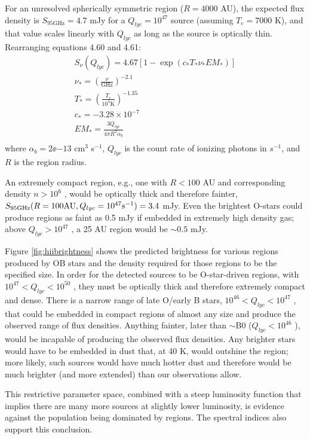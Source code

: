 \documentclass[twocolumn]{aastex61}
\begin{document}
For an unresolved spherically symmetric \hii region ($R=4000$ AU), the expected
flux density is $S_{95 \mathrm{GHz}} = 4.7$ mJy for a $Q_{lyc}=10^{47}$ \pers
source (assuming $T_e=7000$ K), and that value scales linearly with $Q_{lyc}$
as long as the source is optically thin.  Rearranging \citet{Condon2007a} equations
4.60 and 4.61:
\begin{eqnarray}
S_{\nu}(Q_{lyc})  = 4.67 \left[1-\exp\left(c_* T_* \nu_* EM_* \right) \right] \nonumber \\
\nu_* = \left(\frac{\nu}{\mathrm{GHz}}\right)^{-2.1} \nonumber \\
T_* = \left(\frac{T_e}{10^4 \mathrm{K}}\right)^{-1.35} \nonumber \\
c_* = -3.28\times10^{-7} \nonumber \\
EM_* = \frac{3 Q_{lyc}}{4 \pi R^2 \alpha_b} \nonumber \\
\end{eqnarray}
where $\alpha_b=2\ee{-13}$ cm$^3$ s$^{-1}$, $Q_{lyc}$ is the count rate
of ionizing photons in $s^{-1}$, and $R$ is the \hii region radius.

An extremely compact \hii region,
e.g., one with $R<100$ AU and corresponding density $n>10^6$ \percc, would be
optically thick and therefore fainter, $S_{95 \mathrm{GHz}}(R=100 \mathrm{AU},
Q_{lyc}=10^{47} \mathrm{s}^{-1})=3.4$ mJy.  Even the brightest O-stars could produce \hii
regions as faint as 0.5 mJy if embedded in extremely high density gas; above
$Q_{lyc}>10^{47}$ \pers, a 25 AU \hii region would be $\sim0.5$ mJy.

Figure \ref{fig:hiibrightness} shows the predicted brightness for various \hii
regions produced by OB stars and the density required for those \hii regions
to be the specified size.  In
order for the detected sources to be O-star-driven \hii regions, with $10^{47}
< Q_{lyc} < 10^{50}$ \pers, they must be optically thick and therefore
extremely compact and dense.  There is a narrow range of late O/early B stars,
$10^{46} < Q_{lyc} < 10^{47}$ \pers, that could be embedded in compact \hii
regions of almost any size and produce the observed range of flux densities.
Anything fainter, later than $\sim$B0 ($Q_{lyc}<10^{46}$ \pers), would be
incapable of producing the observed flux densities.
Any brighter stars would have to be embedded in dust that, at 40 K, would
outshine the \hii region; more likely, such sources would have much hotter dust
and therefore would be much brighter (and more extended) than our observations
allow.

This restrictive parameter space, combined with a steep luminosity function
that implies there are many more sources at slightly lower luminosity, is
evidence against the population being dominated by \hii regions.  The spectral
indices also support this conclusion.
\end{document}
